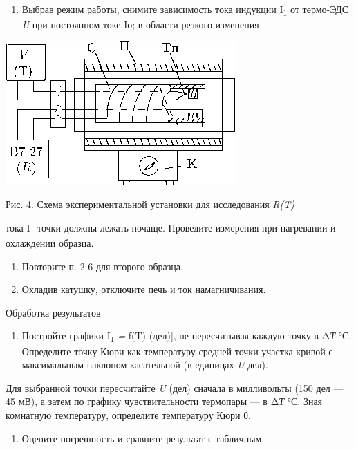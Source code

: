 \documentclass[]{article}
\begin{document}
\begin{enumerate}
\def\labelenumi{\arabic{enumi}.}
\item
  Выбрав режим работы, снимите зависимость тока индукции
  I\textsubscript{1} от термо-ЭДС \emph{U} при постоянном токе Iо; в
  области резкого изменения
\end{enumerate}

\includegraphics{./media/image4.png}

Рис. 4. Схема экспериментальной установки для исследования \emph{R(T)}

тока I\textsubscript{1} точки должны лежать почаще. Проведите измерения
при нагревании и охлаждении образца.

\begin{enumerate}
\def\labelenumi{\arabic{enumi}.}
\item
  Повторите п. 2-6 для второго образца.
\item
  Охладив катушку, отключите печь и ток намагничивания.
\end{enumerate}

Обработка результатов

\begin{enumerate}
\def\labelenumi{\arabic{enumi}.}
\item
  Постройте графики I\textsubscript{1} \emph{=} f(T) (дел){]}, не
  пересчитывая каждую точ­ку в Δ\emph{Т} °С. Определите точку Кюри как
  температуру средней точки участка кривой с максимальным наклоном
  касательной (в единицах \emph{U} дел).
\end{enumerate}

Для выбранной точки пересчитайте \emph{U} (дел) сначала в милливольты
(150 дел --- 45 мВ), а затем по графику чувствительности термопары --- в
Δ\emph{Т} °С. Зная комнатную температуру, определите температуру Кю­ри
θ.

\begin{enumerate}
\def\labelenumi{\arabic{enumi}.}
\item
  Оцените погрешность и сравните результат с табличным.
\end{enumerate}
\end{document}
